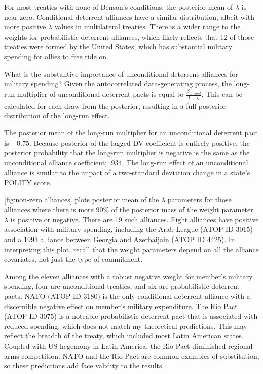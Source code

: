 \documentclass[12pt]{article}
\begin{document}
For most treaties with none of Benson's conditions, the posterior mean of $\lambda$ is near zero. Conditional deterrent alliances have a similar distribution, albeit with more positive $\lambda$ values in multilateral treaties. There is a wider range to the weights for probabilistic deterrent alliances, which likely reflects that 12 of those treaties were formed by the United States, which has substantial military spending for allies to free ride on. 

What is the substantive importance of unconditional deterrent alliances for military spending? Given the autocorrelated data-generating process, the long-run multiplier of unconditional deterrent pacts is equal to $\frac{\beta_{uncond}}{ 1 - \eta}$. This can be calculated for each draw from the posterior, resulting in a full posterior distribution of the long-run effect. 

The posterior mean of the long-run multiplier for an unconditional deterrent pact is $-0.75$. Because posterior of the lagged DV coefficient is entirely positive, the posterior probability that the long-run multiplier is negative is the same as the unconditional alliance coefficient; $.934$. The long-run effect of an unconditional alliance is similar to the impact of a two-standard deviation change in a state's POLITY score.

\autoref{fig:non-zero alliances} plots posterior mean of the $\lambda$ parameters for those alliances where there is more 90\% of the posterior mass of the weight parameter $\lambda$ is positive or negative. There are 19 such alliances. Eight alliances have positive association with military spending, including the Arab League (ATOP ID 3015) and a 1993 alliance between Georgia and Azerbaijain (ATOP ID 4425). In interpreting this plot, recall that the weight parameters depend on all the alliance covariates, not just the type of commitment. 

Among the eleven alliances with a robust negative weight for member's military spending, four are unconditional treaties, and six are probabilistic deterrent pacts. NATO (ATOP ID 3180) is the only conditional deterrent alliance with a discernible negative effect on member's military expenditure.  The Rio Pact (ATOP ID 3075) is a noteable probabilistic deterrent pact that is associated with reduced spending, which does not match my theoretical predictions. This may reflect the breadth of the treaty, which included most Latin American states. Coupled with US hegemony in Latin America, the Rio Pact diminished regional arms competition. NATO and the Rio Pact are common examples of substitution, so these predictions add face validity to the results. 
\end{document}
